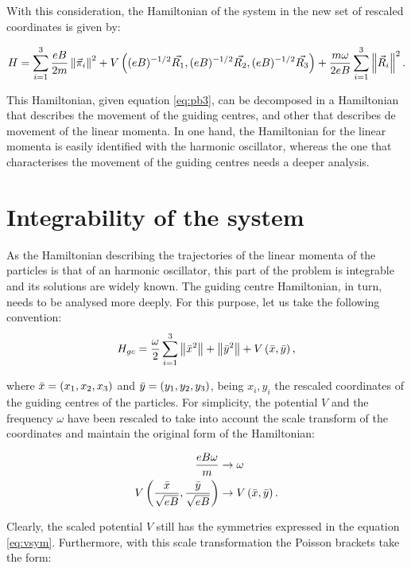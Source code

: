 With this consideration, the Hamiltonian of the system in the new set of rescaled coordinates is given by:

\begin{equation}
H = \sum_{i=1}^{3} \frac{eB}{2m} \left\lVert  \vec{\pi}_i \right\rVert^2
+ V\left(  (eB)^{-1/2}\vec{R_1},(eB)^{-1/2}\vec{R_2}, (eB)^{-1/2}\vec{R_3}  \right)
+\frac{m\omega}{2eB}\sum_{i=1}^{3} \left\lVert \vec{R}_i \right\rVert^2.
\label{eq:newham}
\end{equation}

This Hamiltonian, given equation \eqref{eq:pb3}, can be decomposed in a Hamiltonian that describes the movement of the guiding centres, and other that describes de movement of the linear momenta. In one hand, the Hamiltonian for the linear momenta is easily identified with the harmonic oscillator, whereas the one that characterises the movement of the guiding centres needs a deeper analysis.

\section{Integrability of the system}
As the Hamiltonian describing the trajectories of the linear momenta of the particles is that of an harmonic oscillator, this part of the problem is integrable and its solutions are widely known. The guiding centre Hamiltonian, in turn, needs to be analysed more deeply. For this purpose, let us take the following convention:\\

\begin{equation}
H_{gc} = \frac{\omega}{2} \sum_{i=1}^{3} \left\lVert \bar{x}^2 \right\rVert + \left\lVert \bar{y}^2 \right\rVert
+ V\left( \bar{x},\bar{y} \right),
\label{eq:hamgc}
\end{equation}

where $\bar{x} = \left( x_1,x_2,x_3 \right)$ and $\bar{y} = \left( y_1,y_2,y_3 \right)$, being $x_i,y_i$ the rescaled coordinates of the guiding centres of the particles. For simplicity, the potential $V$ and the frequency $\omega$ have been rescaled to take into account the scale transform of the coordinates and maintain the original form of the Hamiltonian:

\begin{align*}
\frac{eB\omega}{m} &\rightarrow \omega\\
 V\left( \frac{\bar{x}}{\sqrt{eB}},\frac{\bar{y}}{\sqrt{eB}} \right) &\rightarrow V\left( \bar{x},\bar{y} \right).
\end{align*}

Clearly, the scaled potential $V$ still has the symmetries expressed in the equation \eqref{eq:vsym}. Furthermore, with this scale transformation the Poisson brackets take the form:

